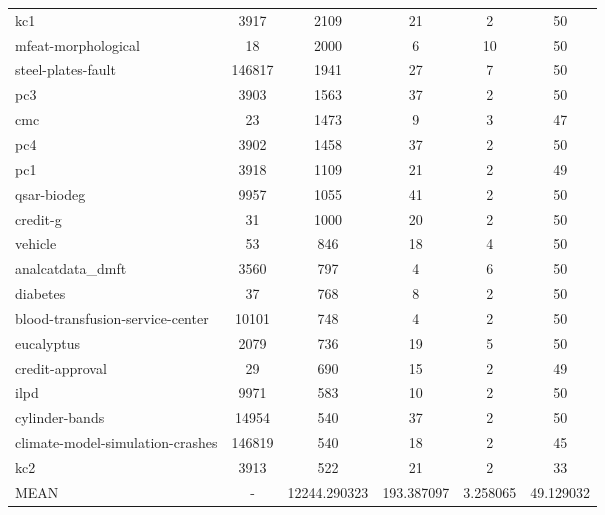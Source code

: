 \documentclass[11pt]{article}
\begin{document}
\begin{table}[h]
{\begin{tabular}{l c | S[table-format=5, round-precision=0]  S[table-format=4.2, round-precision=2] S[table-format=2.2, round-precision=2] | S[table-format=2.2, round-precision=2]}
        kc1 \citep{Sayyad-Shirabad+Menzies:2005}& 3917 & 2109 & 21 & 2 & 50\\
        mfeat-morphological \citep{Dua:2019} & 18 & 2000 & 6 & 10 & 50\\
        steel-plates-fault \citep{provided2019research}& 146817 & 1941 & 27 & 7 & 50\\
        pc3 \citep{Sayyad-Shirabad+Menzies:2005}& 3903 & 1563 & 37 & 2 & 50\\
        cmc \citep{Dua:2019} & 23 & 1473 & 9 & 3 & 47\\
        pc4 \citep{Sayyad-Shirabad+Menzies:2005}& 3902 & 1458 & 37 & 2 & 50\\
        pc1 \citep{Sayyad-Shirabad+Menzies:2005}& 3918 & 1109 & 21 & 2 & 49\\
        qsar-biodeg \citep{mansouri2013quantitative} & 9957 & 1055 & 41 & 2 & 50\\
        credit-g \citep{Dua:2019} & 31 & 1000 & 20 & 2 & 50\\
        vehicle \citep{siebert1987vehicle} & 53 & 846 & 18 & 4 & 50\\
        analcatdata\_dmft \citep{simonoff2003analyzing} & 3560 & 797 & 4 & 6 & 50\\
        diabetes \citep{Dua:2019} & 37 & 768 & 8 & 2 & 50\\
        blood-transfusion-service-center \citep{yeh2009knowledge} & 10101 & 748 & 4 & 2 & 50\\
        eucalyptus \citep{bulloch1991eucalyptus} & 2079 & 736 & 19 & 5 & 50\\
        credit-approval \citep{Dua:2019} & 29 & 690 & 15 & 2 & 49\\
        ilpd \citep{Dua:2019} & 9971 & 583 & 10 & 2 & 50\\
        cylinder-bands \citep{evans1994overcoming,Dua:2019}& 14954 & 540 & 37 & 2 & 50\\
        climate-model-simulation-crashes \citep{lucas2013failure} & 146819 & 540 & 18 & 2 & 45\\
        kc2 \citep{Sayyad-Shirabad+Menzies:2005} & 3913 & 522 & 21 & 2 & 33\\
        \midrule
        MEAN & - & 12244.290323 & 193.387097 & 3.258065 & 49.129032\\
        \bottomrule
   \end{tabular}}
\end{table}
\addtocounter{footnote}{-2}
 \addtocounter{footnote}{1}
 \addtocounter{footnote}{1}
\end{document}

